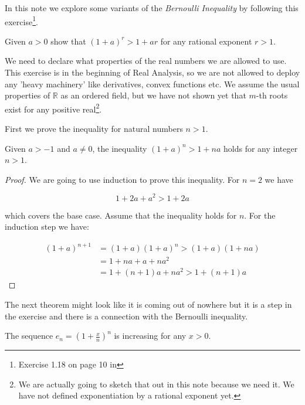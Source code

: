 In this note we explore some variants of the \emph{Bernoulli Inequality} by following this exercise\footnote{Exercise 1.18 on page 10 in }.

\vspace{10 mm}
\begin{problem}
Given $a > 0$ show that $(1 + a)^r > 1 + a r$ for any rational exponent $r > 1$.
\end{problem}

We need to declare what properties of the real numbers we are allowed to use. This exercise is in the beginning of Real Analysis, so we are not allowed to deploy any 'heavy machinery' like derivatives, convex functions etc. We assume the usual properties of $\mathbb{R}$ as an ordered field, but we have not shown yet that $m$-th roots exist for any positive real\footnote{We are actually going to sketch that out in this note because we need it. We have not defined exponentiation by a rational exponent yet.}.

First we prove the inequality for natural numbers $n > 1$.

\begin{thm}\label{bernoulli_naturals}
Given $a > -1$ and $a \neq 0$, the inequality $(1 + a)^n > 1 + n a$ holds for any integer $n > 1$. 
\end{thm}

\begin{proof}

We are going to use induction to prove this inequality. For $n = 2$ we have

$$
1 + 2 a + a^2 > 1 + 2 a
$$

which covers the base case. Assume that the inequality holds for $n$. For the induction step we have:

\begin{align*}
(1 + a)^{n+1} &= (1 + a) (1 + a)^n > (1 + a) (1 + n a) \\
              &= 1 + n a + a + n a^2 \\
              &= 1 + (n + 1) a + n a^2 > 1 + (n + 1) a
\end{align*}

\end{proof}

The next theorem might look like it is coming out of nowhere but it is a step in the exercise and there is a connection with the Bernoulli inequality.

\begin{thm}\label{bernoulli_increasing}
The sequence $e_n = (1 + \frac{x}{n})^n$ is increasing for any $x > 0$.
\end{thm}

